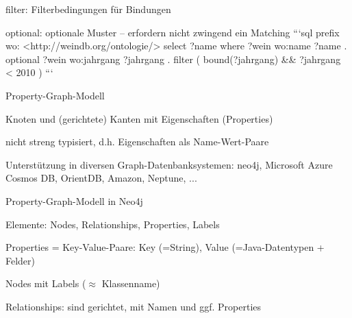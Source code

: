 \documentclass[a4paper]{article}
\begin{document}
\begin{multicols}{3}
\begin{itemize*}
\begin{itemize*}
        \begin{itemize*}
            \item filter: Filterbedingungen für Bindungen
            \item optional: optionale Muster – erfordern nicht zwingend ein Matching
            ```sql
            prefix wo: <http://weindb.org/ontologie/>
            select ?name
            where { ?wein wo:name ?name . }
            optional { ?wein wo:jahrgang ?jahrgang } .
            filter ( bound(?jahrgang) \&\& ?jahrgang < 2010 )
            ```
        \end{itemize*}
    \end{itemize*}

    Property-Graph-Modell
    \begin{itemize*}
        \item Knoten und (gerichtete) Kanten mit Eigenschaften (Properties)
        \item nicht streng typisiert, d.h. Eigenschaften als Name-Wert-Paare
        \item Unterstützung in diversen Graph-Datenbanksystemen: neo4j, Microsoft Azure Cosmos DB, OrientDB, Amazon, Neptune, ...
        \item Property-Graph-Modell in Neo4j
        \begin{itemize*}
            \item Elemente: Nodes, Relationships, Properties, Labels
            \item Properties = Key-Value-Paare: Key (=String), Value (=Java-Datentypen + Felder)
            \item Nodes mit Labels ($\approx$ Klassenname)
            \item Relationships: sind gerichtet, mit Namen und ggf. Properties
        \end{itemize*}
    \end{itemize*}


\end{itemize*}
\end{multicols}
\end{document}
